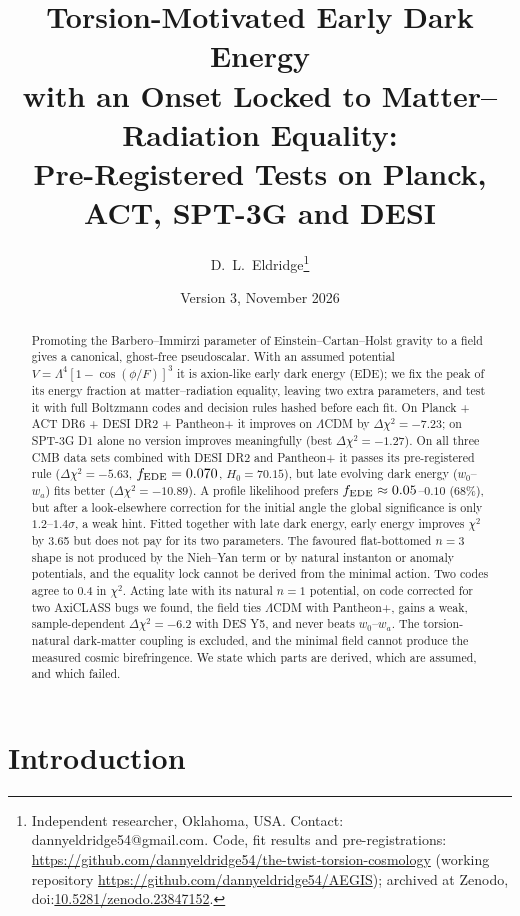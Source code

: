 \documentclass[11pt]{article}
\title{\textbf{Torsion-Motivated Early Dark Energy\\ with an Onset Locked to Matter--Radiation Equality:\\
Pre-Registered Tests on Planck, ACT, SPT-3G and DESI}}
\author{D.~L.~Eldridge\thanks{Independent researcher, Oklahoma, USA. Contact: dannyeldridge54@gmail.com.
Code, fit results and pre-registrations: \url{https://github.com/dannyeldridge54/the-twist-torsion-cosmology}
(working repository \url{https://github.com/dannyeldridge54/AEGIS}); archived at Zenodo, doi:\href{https://doi.org/10.5281/zenodo.23847152}{10.5281/zenodo.23847152}.}}
\date{Version 3, November 2026}
\begin{document}
\maketitle

\begin{abstract}
Promoting the Barbero--Immirzi parameter of Einstein--Cartan--Holst gravity to a field gives a
canonical, ghost-free pseudoscalar. With an assumed potential $V=\Lambda^4[1-\cos(\phi/F)]^3$ it is
axion-like early dark energy (EDE); we fix the peak of its energy fraction at matter--radiation
equality, leaving two extra parameters, and test it with full Boltzmann codes and decision rules hashed
before each fit. On Planck + ACT DR6 + DESI DR2 + Pantheon+ it improves on $\Lambda$CDM by
$\Delta\chi^2=-7.23$; on SPT-3G D1 alone no version improves meaningfully (best $\Delta\chi^2=-1.27$). On all three CMB
data sets combined with DESI DR2 and Pantheon+ it passes its pre-registered rule ($\Delta\chi^2=-5.63$,
$f_{\rm EDE}=0.070$, $H_0=70.15$), but late evolving dark energy ($w_0$--$w_a$) fits better
($\Delta\chi^2=-10.89$). A profile likelihood prefers $f_{\rm EDE}\approx0.05$--$0.10$
(68\%), but after a look-elsewhere correction for the initial angle the global significance is only
$1.2$--$1.4\sigma$, a weak hint. Fitted together with late dark energy, early energy improves $\chi^2$ by 3.65 but
does not pay for its two parameters. The favoured flat-bottomed $n=3$ shape is not produced by the Nieh--Yan term
or by natural instanton or anomaly potentials, and the equality lock cannot be derived from the minimal action. Two
codes agree to 0.4 in $\chi^2$. Acting late with its
natural $n=1$ potential, on code corrected for two AxiCLASS bugs we found, the field ties $\Lambda$CDM with Pantheon+,
gains a weak, sample-dependent $\Delta\chi^2=-6.2$ with DES Y5, and never beats $w_0$--$w_a$. The torsion-natural
dark-matter coupling is excluded, and the minimal field cannot produce the measured cosmic birefringence. We state
which parts are derived, which are assumed, and which failed.
\end{abstract}

\tableofcontents

\section{Introduction}\label{sec:intro}
\end{document}

